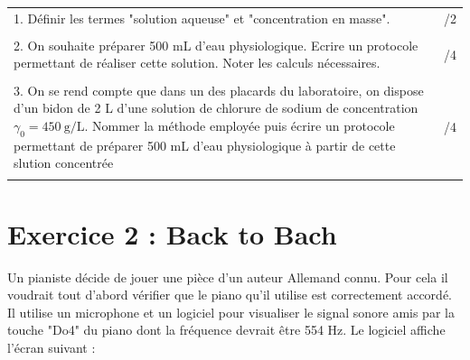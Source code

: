 \documentclass[a4paper,12pt]{article}
\begin{document}
\begin{tabular}{m{.9\linewidth}|m{.1\linewidth}}
    1. Définir les termes "solution aqueuse" et "concentration en masse". & /2\\
    \rule{0pt}{2cm} & \\
    2. On souhaite préparer 500 mL d'eau physiologique. Ecrire un protocole permettant de réaliser cette solution. Noter les calculs nécessaires. & /4\\
    \rule{0pt}{4cm} & \\
    3. On se rend compte que dans un des placards du laboratoire, on dispose d'un bidon de 2 L d'une solution de chlorure de sodium de concentration $\gamma_0 = \SI{450}{\gram\per\liter}$. Nommer la méthode employée puis écrire un protocole permettant de préparer 500 mL d'eau physiologique à partir de cette slution concentrée & /4\\
    \rule{0pt}{4cm} & \\
\end{tabular}

\newpage
\section*{Exercice 2 : Back to Bach}
Un pianiste décide de jouer une pièce d'un auteur Allemand connu. Pour cela il voudrait tout d'abord vérifier que le piano qu'il utilise est correctement accordé. Il utilise un microphone et un logiciel pour visualiser le signal sonore amis par la touche "Do4" du piano dont la fréquence devrait être 554 Hz.
Le logiciel affiche l'écran suivant :\\

\\
\end{document}
